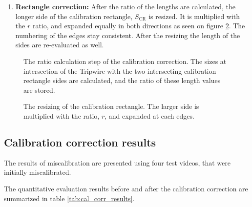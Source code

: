\begin{enumerate}
	with $fl(k_{\text{CR}}), fl(K_{\text{CR}})$ being the length values of the fitted line in the $k_{\text{CR}}$ and $K_{\text{CR}}$, intersection points of the Tripwire.
	These length values correspond to the average values of the lengths stored in the proper rows of the Size Timeline.
	 
	After, the ratio of these two lengths is calculated, quantifying the degree of miscalibration, $r$:
	
	\begin{displaymath}
		r = \frac{L}{l}.
	\end{displaymath}
	
	The notations used are illustrated in figure \ref{fig:ratio_calculation}.
	
	\item  \textbf{Rectangle correction:}
	After the ratio of the lengths are calculated, the longer side of the calibration rectangle, $S_{\text{CR}}$ is resized.
	It is multiplied with the $r$ ratio, and expanded equally in both directions as seen on figure \ref{fig:resizing_cr}. 
	The numbering of the edges stay consistent.
	After the resizing the length of the sides are re-evaluated as well.
\end{enumerate}

\begin{figure}[!h]
	\centering
	
	\caption{The ratio calculation step of the calibration correction. The sizes at intersection of the Tripwire with the two intersecting calibration rectangle sides are calculated, and the ratio of these length values are stored. \label{fig:ratio_calculation}}
\end{figure}

\begin{figure}[!h]
	\centering
	
	\caption{The resizing of the calibration rectangle. The larger side is multiplied with the ratio, $r$, and expanded at each edges. \label{fig:resizing_cr}}
\end{figure}

\subsection{Calibration correction results}
The results of miscalibration are presented using four test videos, that were initially miscalibrated.

The quantitative evaluation results before and after the calibration correction are summarized in table \ref{tab:cal_corr_results}.

